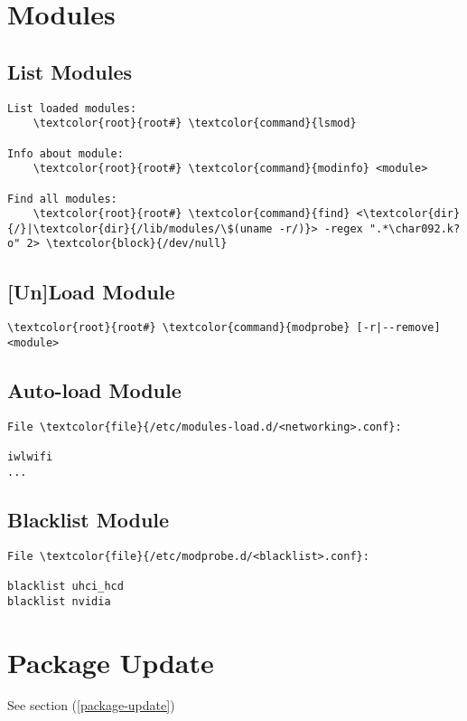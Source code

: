 \documentclass[10pt, a4paper, onecolumn, openany]{book}         %
\begin{document}
\section{Modules}
\subsection{List Modules}
\begin{Verbatim}[commandchars=\\\{\}]
List loaded modules:
    \textcolor{root}{root#} \textcolor{command}{lsmod}

Info about module:
    \textcolor{root}{root#} \textcolor{command}{modinfo} <module>
    
Find all modules:
    \textcolor{root}{root#} \textcolor{command}{find} <\textcolor{dir}{/}|\textcolor{dir}{/lib/modules/\$(uname -r/)}> -regex ".*\char092.k?o" 2> \textcolor{block}{/dev/null}
\end{Verbatim}

\subsection{[Un]Load Module}
\begin{Verbatim}[commandchars=\\\{\}]
    \textcolor{root}{root#} \textcolor{command}{modprobe} [-r|--remove] <module>
\end{Verbatim}

\subsection{Auto-load Module}
\begin{Verbatim}[commandchars=\\\{\}]
File \textcolor{file}{/etc/modules-load.d/<networking>.conf}:

iwlwifi
...
\end{Verbatim}
\subsection{Blacklist Module}
\begin{Verbatim}[commandchars=\\\{\}]
File \textcolor{file}{/etc/modprobe.d/<blacklist>.conf}:

blacklist uhci_hcd
blacklist nvidia
\end{Verbatim}


\section{Package Update}
See section (\underline{\ref{package-update}})
\end{document}
